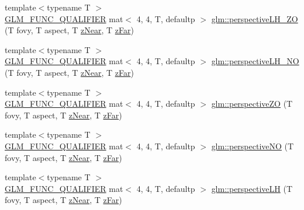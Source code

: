 \begin{DoxyCompactItemize}
{\footnotesize template$<$typename T $>$ }\\\hyperlink{setup_8hpp_a33fdea6f91c5f834105f7415e2a64407}{G\+L\+M\+\_\+\+F\+U\+N\+C\+\_\+\+Q\+U\+A\+L\+I\+F\+I\+ER} mat$<$ 4, 4, T, defaultp $>$ \hyperlink{group__gtc__matrix__transform_gaca32af88c2719005c02817ad1142986c}{glm\+::perspective\+L\+H\+\_\+\+ZO} (T fovy, T aspect, T \hyperlink{_s_d_l__opengl__glext_8h_a12d99226e590bbaaf0be69169eeb4834}{z\+Near}, T \hyperlink{_s_d_l__opengl__glext_8h_a1052a8235df129542aea6da80fbec6a1}{z\+Far})
\item 
{\footnotesize template$<$typename T $>$ }\\\hyperlink{setup_8hpp_a33fdea6f91c5f834105f7415e2a64407}{G\+L\+M\+\_\+\+F\+U\+N\+C\+\_\+\+Q\+U\+A\+L\+I\+F\+I\+ER} mat$<$ 4, 4, T, defaultp $>$ \hyperlink{group__gtc__matrix__transform_gaead4d049d1feab463b700b5641aa590e}{glm\+::perspective\+L\+H\+\_\+\+NO} (T fovy, T aspect, T \hyperlink{_s_d_l__opengl__glext_8h_a12d99226e590bbaaf0be69169eeb4834}{z\+Near}, T \hyperlink{_s_d_l__opengl__glext_8h_a1052a8235df129542aea6da80fbec6a1}{z\+Far})
\item 
{\footnotesize template$<$typename T $>$ }\\\hyperlink{setup_8hpp_a33fdea6f91c5f834105f7415e2a64407}{G\+L\+M\+\_\+\+F\+U\+N\+C\+\_\+\+Q\+U\+A\+L\+I\+F\+I\+ER} mat$<$ 4, 4, T, defaultp $>$ \hyperlink{group__gtc__matrix__transform_gaa9dfba5c2322da54f72b1eb7c7c11b47}{glm\+::perspective\+ZO} (T fovy, T aspect, T \hyperlink{_s_d_l__opengl__glext_8h_a12d99226e590bbaaf0be69169eeb4834}{z\+Near}, T \hyperlink{_s_d_l__opengl__glext_8h_a1052a8235df129542aea6da80fbec6a1}{z\+Far})
\item 
{\footnotesize template$<$typename T $>$ }\\\hyperlink{setup_8hpp_a33fdea6f91c5f834105f7415e2a64407}{G\+L\+M\+\_\+\+F\+U\+N\+C\+\_\+\+Q\+U\+A\+L\+I\+F\+I\+ER} mat$<$ 4, 4, T, defaultp $>$ \hyperlink{group__gtc__matrix__transform_gaf497e6bca61e7c87088370b126a93758}{glm\+::perspective\+NO} (T fovy, T aspect, T \hyperlink{_s_d_l__opengl__glext_8h_a12d99226e590bbaaf0be69169eeb4834}{z\+Near}, T \hyperlink{_s_d_l__opengl__glext_8h_a1052a8235df129542aea6da80fbec6a1}{z\+Far})
\item 
{\footnotesize template$<$typename T $>$ }\\\hyperlink{setup_8hpp_a33fdea6f91c5f834105f7415e2a64407}{G\+L\+M\+\_\+\+F\+U\+N\+C\+\_\+\+Q\+U\+A\+L\+I\+F\+I\+ER} mat$<$ 4, 4, T, defaultp $>$ \hyperlink{group__gtc__matrix__transform_ga9bd34951dc7022ac256fcb51d7f6fc2f}{glm\+::perspective\+LH} (T fovy, T aspect, T \hyperlink{_s_d_l__opengl__glext_8h_a12d99226e590bbaaf0be69169eeb4834}{z\+Near}, T \hyperlink{_s_d_l__opengl__glext_8h_a1052a8235df129542aea6da80fbec6a1}{z\+Far})

\end{DoxyCompactItemize}
